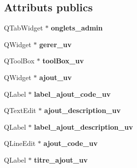 \subsection*{Attributs publics}
\begin{DoxyCompactItemize}
\item 
\hypertarget{class_ui___administration_a500ba19bf4813a712abe8fe3eac2f439}{Q\+Tab\+Widget $\ast$ {\bfseries onglets\+\_\+admin}}\label{class_ui___administration_a500ba19bf4813a712abe8fe3eac2f439}

\item 
\hypertarget{class_ui___administration_acd89460fb397f4d0d064fba4f80e93bf}{Q\+Widget $\ast$ {\bfseries gerer\+\_\+uv}}\label{class_ui___administration_acd89460fb397f4d0d064fba4f80e93bf}

\item 
\hypertarget{class_ui___administration_ab2ce200bb238057dbf42409933069ab2}{Q\+Tool\+Box $\ast$ {\bfseries tool\+Box\+\_\+uv}}\label{class_ui___administration_ab2ce200bb238057dbf42409933069ab2}

\item 
\hypertarget{class_ui___administration_a525a96ec8f92fe559948f9046ac78dbd}{Q\+Widget $\ast$ {\bfseries ajout\+\_\+uv}}\label{class_ui___administration_a525a96ec8f92fe559948f9046ac78dbd}

\item 
\hypertarget{class_ui___administration_a98cfaf57e23e941210f0b8e0e25c3348}{Q\+Label $\ast$ {\bfseries label\+\_\+ajout\+\_\+code\+\_\+uv}}\label{class_ui___administration_a98cfaf57e23e941210f0b8e0e25c3348}

\item 
\hypertarget{class_ui___administration_ae5e2591b45e6ebc27469107569e64121}{Q\+Text\+Edit $\ast$ {\bfseries ajout\+\_\+description\+\_\+uv}}\label{class_ui___administration_ae5e2591b45e6ebc27469107569e64121}

\item 
\hypertarget{class_ui___administration_ac71d7242c74540b4f1cf8a5a4a1ded7a}{Q\+Label $\ast$ {\bfseries label\+\_\+ajout\+\_\+description\+\_\+uv}}\label{class_ui___administration_ac71d7242c74540b4f1cf8a5a4a1ded7a}

\item 
\hypertarget{class_ui___administration_ad2bdfcc6cc68f15d764138938cdf5424}{Q\+Line\+Edit $\ast$ {\bfseries ajout\+\_\+code\+\_\+uv}}\label{class_ui___administration_ad2bdfcc6cc68f15d764138938cdf5424}

\item 
\hypertarget{class_ui___administration_a476c0465d7a4f6526a280ae43913745e}{Q\+Label $\ast$ {\bfseries titre\+\_\+ajout\+\_\+uv}}\label{class_ui___administration_a476c0465d7a4f6526a280ae43913745e}


\end{DoxyCompactItemize}
